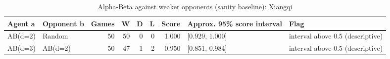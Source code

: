 \begin{table}[!t]
\centering
\caption{Alpha-Beta against weaker opponents (sanity baseline): Xiangqi}
\label{tab:ab_self_xiangqi}
\small
\begin{tabular}{llrrrrrll}
\toprule
Agent a & Opponent b & Games & W & D & L & Score & Approx. 95\% score interval & Flag \\
\midrule
AB(d=2) & Random & 50 & 50 & 0 & 0 & 1.000 & [0.929, 1.000] & interval above 0.5 (descriptive) \\
AB(d=3) & AB(d=2) & 50 & 47 & 1 & 2 & 0.950 & [0.851, 0.984] & interval above 0.5 (descriptive) \\
\bottomrule
\end{tabular}
\end{table}
